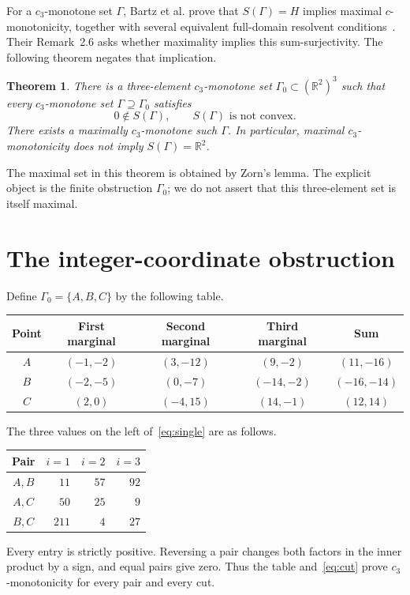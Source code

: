 \documentclass[11pt]{article}
\newtheorem{theorem}{Theorem}
\newcommand{\R}{\mathbb R}
\begin{document}
For a $c_3$-monotone set $\Gamma$, Bartz et al. prove that
$S(\Gamma)=H$ implies maximal
$c$-monotonicity, together with several equivalent full-domain resolvent
conditions~\cite[Theorem~2.5]{BBPW}. Their Remark~2.6 asks whether
maximality implies this sum-surjectivity. The following theorem negates
that implication.

\begin{theorem}\label{thm:main}
There is a three-element $c_3$-monotone set $\Gamma_0\subset(\R^2)^3$ such
that every $c_3$-monotone set $\Gamma\supseteq\Gamma_0$ satisfies
\[
 0\notin S(\Gamma),\qquad S(\Gamma)\text{ is not convex}.
\]
There exists a maximally $c_3$-monotone such $\Gamma$. In particular,
maximal $c_3$-monotonicity does not imply $S(\Gamma)=\R^2$.
\end{theorem}

The maximal set in this theorem is obtained by Zorn's lemma. The explicit
object is the finite obstruction $\Gamma_0$; we do not assert that this
three-element set is itself maximal.

\section{The integer-coordinate obstruction}

Define $\Gamma_0=\{A,B,C\}$ by the following table.
\begin{center}
\begin{tabular}{c@{\quad}ccc@{\quad}c}
\toprule
Point & First marginal & Second marginal & Third marginal & Sum\\
\midrule
$A$ & $(-1,-2)$ & $(3,-12)$ & $(9,-2)$ & $(11,-16)$\\
$B$ & $(-2,-5)$ & $(0,-7)$ & $(-14,-2)$ & $(-16,-14)$\\
$C$ & $(2,0)$ & $(-4,15)$ & $(14,-1)$ & $(12,14)$\\
\bottomrule
\end{tabular}
\end{center}

The three values on the left of~\eqref{eq:single} are as follows.
\begin{center}
\begin{tabular}{c@{\qquad}rrr}
\toprule
Pair & $i=1$ & $i=2$ & $i=3$\\
\midrule
$A,B$ & $11$ & $57$ & $92$\\
$A,C$ & $50$ & $25$ & $9$\\
$B,C$ & $211$ & $4$ & $27$\\
\bottomrule
\end{tabular}
\end{center}
Every entry is strictly positive. Reversing a pair changes both factors
in the inner product by a sign, and equal pairs give zero. Thus the table
and~\eqref{eq:cut} prove $c_3$-monotonicity for every pair and every cut.
\end{document}
